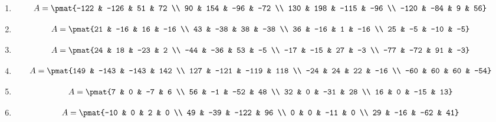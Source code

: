 \begin{enumerate}
\item

\begin{align*}
A = \pmat{-122 & -126 & 51 & 72 \\ 90 & 154 & -96 & -72 \\ 130 & 198 & -115 & -96 \\ -120 & -84 & 9 & 56}
\end{align*}

\item

\begin{align*}
A = \pmat{21 & -16 & 16 & -16 \\ 43 & -38 & 38 & -38 \\ 36 & -16 & 1 & -16 \\ 25 & -5 & -10 & -5}
\end{align*}

\item

\begin{align*}
A = \pmat{24 & 18 & -23 & 2 \\ -44 & -36 & 53 & -5 \\ -17 & -15 & 27 & -3 \\ -77 & -72 & 91 & -3}
\end{align*}

\item

\begin{align*}
A = \pmat{149 & -143 & -143 & 142 \\ 127 & -121 & -119 & 118 \\ -24 & 24 & 22 & -16 \\ -60 & 60 & 60 & -54}
\end{align*}

\item

\begin{align*}
A = \pmat{7 & 0 & -7 & 6 \\ 56 & -1 & -52 & 48 \\ 32 & 0 & -31 & 28 \\ 16 & 0 & -15 & 13}
\end{align*}

\item

\begin{align*}
A = \pmat{-10 & 0 & 2 & 0 \\ 49 & -39 & -122 & 96 \\ 0 & 0 & -11 & 0 \\ 29 & -16 & -62 & 41}
\end{align*}


\end{enumerate}
